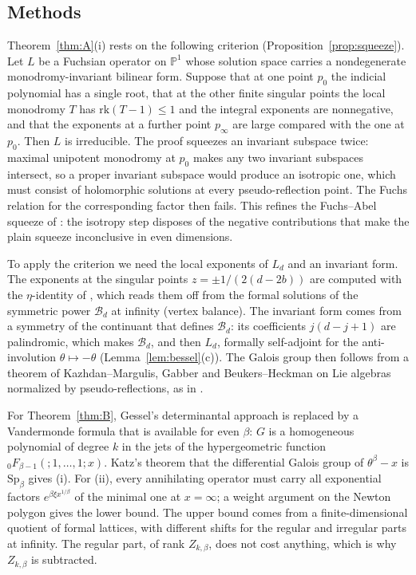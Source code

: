 \documentclass[11pt]{amsart}
\theoremstyle{definition}
\newcommand{\PP}{\mathbb P}
\newcommand{\cB}{\mathcal B}
\newcommand{\Sp}{\mathrm{Sp}}
\newcommand{\rk}{\mathrm{rk}}
\begin{document}
\subsection{Methods}
Theorem~\ref{thm:A}(i) rests on the following criterion (Proposition~\ref{prop:squeeze}). Let $L$ be a Fuchsian operator on $\PP^1$ whose solution space carries a nondegenerate monodromy-invariant bilinear form. Suppose that at one point $p_0$ the indicial polynomial has a single root, that at the other finite singular points the local monodromy $T$ has $\rk(T-1)\le1$ and the integral exponents are nonnegative, and that the exponents at a further point $p_\infty$ are large compared with the one at $p_0$. Then $L$ is irreducible. The proof squeezes an invariant subspace twice: maximal unipotent monodromy at $p_0$ makes any two invariant subspaces intersect, so a proper invariant subspace would produce an isotropic one, which must consist of holomorphic solutions at every pseudo-reflection point. The Fuchs relation for the corresponding factor then fails. This refines the Fuchs--Abel squeeze of \cite{KBT,KVB}: the isotropy step disposes of the negative contributions that make the plain squeeze inconclusive in even dimensions.

To apply the criterion we need the local exponents of $L_d$ and an invariant form. The exponents at the singular points $z=\pm1/(2(d-2b))$ are computed with the $\eta$-identity of \cite{KVB}, which reads them off from the formal solutions of the symmetric power $\cB_d$ at infinity (vertex balance). The invariant form comes from a symmetry of the continuant that defines $\cB_d$: its coefficients $j(d-j+1)$ are palindromic, which makes $\cB_d$, and then $L_d$, formally self-adjoint for the anti-involution $\theta\mapsto-\theta$ (Lemma~\ref{lem:bessel}(c)). The Galois group then follows from a theorem of Kazhdan--Margulis, Gabber and Beukers--Heckman on Lie algebras normalized by pseudo-reflections, as in \cite{KBan2}.

For Theorem~\ref{thm:B}, Gessel's determinantal approach is replaced by a Vandermonde formula that is available for even $\beta$: $G$ is a homogeneous polynomial of degree $k$ in the jets of the hypergeometric function ${}_0F_{\beta-1}(;1,\dots,1;x)$. Katz's theorem that the differential Galois group of $\theta^\beta-x$ is $\Sp_\beta$ \cite{Kat87} gives (i). For (ii), every annihilating operator must carry all exponential factors $e^{\beta\xi x^{1/\beta}}$ of the minimal one at $x=\infty$; a weight argument on the Newton polygon gives the lower bound. The upper bound comes from a finite-dimensional quotient of formal lattices, with different shifts for the regular and irregular parts at infinity. The regular part, of rank $Z_{k,\beta}$, does not cost anything, which is why $Z_{k,\beta}$ is subtracted.
\end{document}
